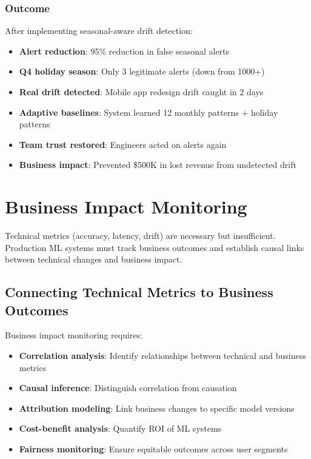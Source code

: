 \subsubsection{Outcome}

After implementing seasonal-aware drift detection:

\begin{itemize}
    \item \textbf{Alert reduction}: 95\% reduction in false seasonal alerts
    \item \textbf{Q4 holiday season}: Only 3 legitimate alerts (down from 1000+)
    \item \textbf{Real drift detected}: Mobile app redesign drift caught in 2 days
    \item \textbf{Adaptive baselines}: System learned 12 monthly patterns + holiday patterns
    \item \textbf{Team trust restored}: Engineers acted on alerts again
    \item \textbf{Business impact}: Prevented \$500K in lost revenue from undetected drift
\end{itemize}

\section{Business Impact Monitoring}

Technical metrics (accuracy, latency, drift) are necessary but insufficient. Production ML systems must track business outcomes and establish causal links between technical changes and business impact.

\subsection{Connecting Technical Metrics to Business Outcomes}

Business impact monitoring requires:
\begin{itemize}
    \item \textbf{Correlation analysis}: Identify relationships between technical and business metrics
    \item \textbf{Causal inference}: Distinguish correlation from causation
    \item \textbf{Attribution modeling}: Link business changes to specific model versions
    \item \textbf{Cost-benefit analysis}: Quantify ROI of ML systems
    \item \textbf{Fairness monitoring}: Ensure equitable outcomes across user segments
\end{itemize}

